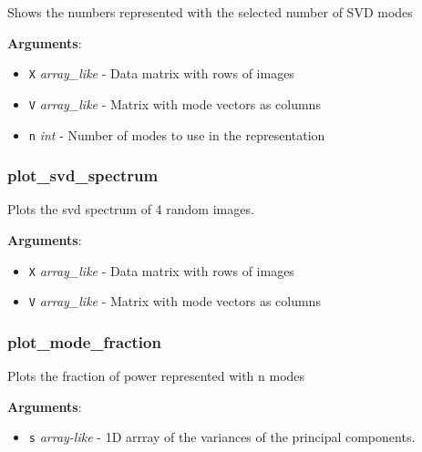 Shows the numbers represented with the selected number of SVD modes

\textbf{Arguments}:

\begin{itemize}
\tightlist
\item
  \texttt{X} \emph{array\_like} - Data matrix with rows of images
\item
  \texttt{V} \emph{array\_like} - Matrix with mode vectors as columns
\item
  \texttt{n} \emph{int} - Number of modes to use in the representation
\end{itemize}

\subsubsection{plot\_svd\_spectrum}

\begin{Shaded}
\begin{Highlighting}[]
\end{Highlighting}
\end{Shaded}

Plots the svd spectrum of 4 random images.

\textbf{Arguments}:

\begin{itemize}
\tightlist
\item
  \texttt{X} \emph{array\_like} - Data matrix with rows of images
\item
  \texttt{V} \emph{array\_like} - Matrix with mode vectors as columns
\end{itemize}

\subsubsection{plot\_mode\_fraction}

\begin{Shaded}
\begin{Highlighting}[]
\end{Highlighting}
\end{Shaded}

Plots the fraction of power represented with n modes

\textbf{Arguments}:

\begin{itemize}
\tightlist
\item
  \texttt{s} \emph{array-like} - 1D arrray of the variances of the
  principal components.
\end{itemize}

